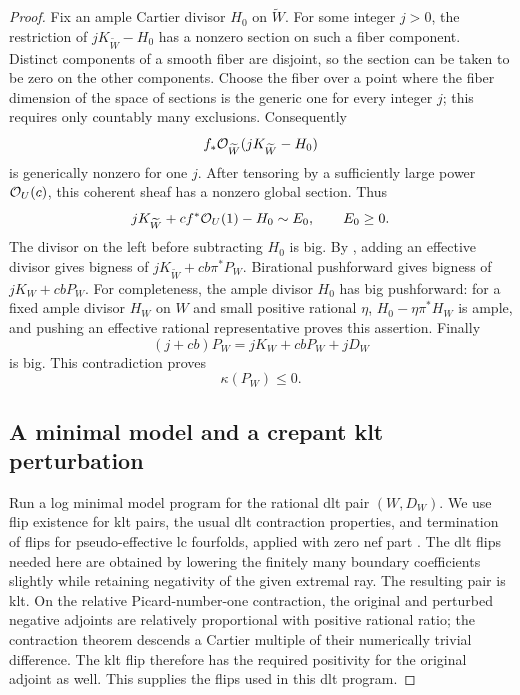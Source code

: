 \begin{proof}
Fix an ample Cartier divisor $H_0$ on $\widetilde W$. For some integer
$j>0$, the restriction of $jK_{\widetilde W}-H_0$ has a nonzero section
on such a fiber component. Distinct components of a smooth fiber are
disjoint, so the section can be taken to be zero on the other
components. Choose the fiber over a point where the fiber dimension of
the space of sections is the generic one for every integer $j$; this
requires only countably many exclusions. Consequently
\[
 f_*\mathcal O_{\widetilde W}(jK_{\widetilde W}-H_0)
\]
is generically nonzero for one $j$. After tensoring by a sufficiently
large power $\mathcal O_U(c)$, this coherent sheaf has a nonzero global
section. Thus
\[
 jK_{\widetilde W}+c f^*\mathcal O_U(1)-H_0\sim E_0,
 \qquad E_0\geq0.
\]
The divisor on the left before subtracting $H_0$ is big. By
, adding an effective divisor gives
bigness of $jK_{\widetilde W}+cb\pi^*P_W$. Birational pushforward gives
bigness of $jK_W+cbP_W$. For completeness, the ample divisor $H_0$
has big pushforward: for a fixed ample divisor $H_W$ on $W$ and small
positive rational $\eta$, $H_0-\eta\pi^*H_W$ is ample, and pushing an
effective rational representative proves this assertion. Finally
\[
 (j+cb)P_W=jK_W+cbP_W+jD_W
\]
is big. This contradiction proves
\begin{equation}
\label{eq:signed-kodaira-small}
 \kappa(P_W)\leq0.
\end{equation}

\subsection*{A minimal model and a crepant klt perturbation}

Run a log minimal model program for the rational dlt pair $(W,D_W)$.
We use flip existence for klt pairs, the usual dlt contraction
properties, and termination of flips for pseudo-effective lc
fourfolds, applied with zero nef part
\cite{BCHM2010,ChenTsakanikas2023}. The dlt flips needed here are
obtained by lowering the finitely many boundary coefficients slightly
while retaining negativity of the given extremal ray. The resulting
pair is klt. On the relative Picard-number-one contraction, the
original and perturbed negative adjoints are relatively proportional
with positive rational ratio; the contraction theorem descends a
Cartier multiple of their numerically trivial difference. The klt
flip therefore has the required positivity for the original adjoint
as well. This supplies the flips used in this dlt program.


\end{proof}
